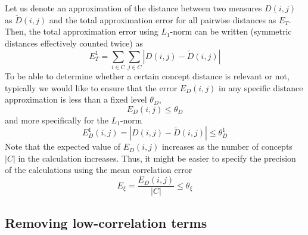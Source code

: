 \documentclass[conference]{IEEEtran}
\begin{document}
Let us denote an approximation of the distance between two measures $D(i, j)$ as $\tilde{D}(i, j)$ and the total approximation error for all pairwise distances as $E_T$. Then, the total approximation error using $L_1$-norm can be written (symmetric distances effectively counted twice) as
\begin{equation}
E^1_T = \sum_{i \in C} \sum_{j \in C} | D(i, j) - \tilde{D}(i,j) |
\end{equation}
To be able to determine whether a certain concept distance is relevant or not, typically we would like to ensure that the error $E_{D}(i,j)$ in any specific distance approximation is less than a fixed level $\theta_D$,
\begin{equation}
E_{D}(i,j) \leq \theta_D
\end{equation}
and more specifically for the $L_1$-norm
\begin{equation}
E_D^1(i,j) = | D(i, j) - \tilde{D}(i,j) | \leq \theta_D^1
\end{equation}
Note that the expected value of $E_{D}(i,j)$ increases as the number of concepts $|C|$ in the calculation increases. Thus, it might be easier to specify the precision of the calculations using the mean correlation error
\begin{equation}
E_\xi = \frac{E_{D}(i,j)}{|C|} \leq \theta_\xi
\end{equation}

\subsection{Removing low-correlation terms}
\label{sec:removinglowcorr}
\end{document}
